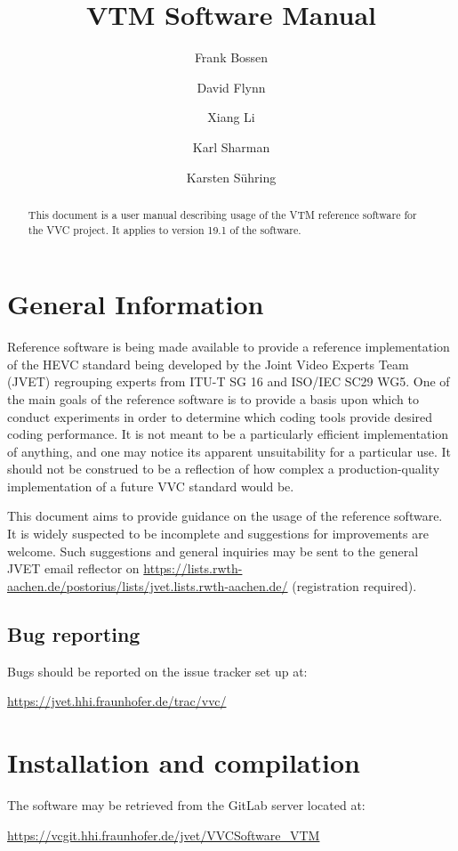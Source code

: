 \documentclass[a4paper,11pt]{jvetdoc}
\title{VTM Software Manual}
\author{%
	Frank Bossen
	\email{frank@bossentech.com}
	\and
	David Flynn
	\and
	Xiang Li
	\email{xlxiangli@google.com}
	\and
	Karl Sharman
	\email{karl.sharman@eu.sony.com}
	\and
	Karsten S\"uhring
	\email{karsten.suehring@hhi.fraunhofer.de}
}
\begin{document}
\maketitle
\begin{abstract}
This document is a user manual describing usage of the VTM reference software
for the VVC project. It applies to version 19.1 of the software.
\end{abstract}

\tableofcontents
\listoftables


\section{General Information}
Reference software is being made available to provide a reference
implementation of the HEVC standard being developed by the Joint 
Video Experts Team (JVET) regrouping experts from
ITU-T SG 16 and ISO/IEC SC29 WG5. One of the main goals of the
reference software is to provide a basis upon which to conduct
experiments in order to determine which coding tools provide desired
coding performance. It is not meant to be a particularly efficient
implementation of anything, and one may notice its apparent
unsuitability for a particular use. It should not be construed to be a
reflection of how complex a production-quality implementation of a
future VVC standard would be.

This document aims to provide guidance on the usage of the reference
software. It is widely suspected to be incomplete and suggestions for
improvements are welcome. Such suggestions and general inquiries may be
sent to the general JVET email reflector on
\url{https://lists.rwth-aachen.de/postorius/lists/jvet.lists.rwth-aachen.de/} 
(registration required).

\subsection*{Bug reporting}
Bugs should be reported on the issue tracker set up at:

\url{https://jvet.hhi.fraunhofer.de/trac/vvc/}

\section{Installation and compilation}
The software may be retrieved from the GitLab server located at:

\url{https://vcgit.hhi.fraunhofer.de/jvet/VVCSoftware_VTM}
\end{document}
